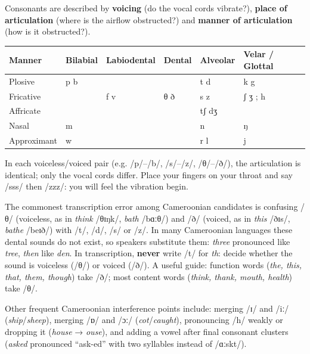 \documentclass[11pt]{article}
\newcounter{popsec}
\newcounter{popsub}
\newcommand{\courssub}[1]{%
  \stepcounter{popsub}%
  \par\vspace{9pt}\noindent{\popxbold\fontsize{11.5}{13}\selectfont\color{popink}{\color{poporange}\thepopsec.\thepopsub}\hspace{6pt}#1}\par\nopagebreak\vspace{4pt}
}
\begin{document}
\courssub{The Consonants}

Consonants are described by \textbf{voicing} (do the vocal cords vibrate?), \textbf{place of articulation} (where is the airflow obstructed?) and \textbf{manner of articulation} (how is it obstructed?).

\begin{center}
\begin{tabularx}{\linewidth}{|l|X|X|X|X|X|}
\hline
\rowcolor{popblueL} \textbf{Manner} & \textbf{Bilabial} & \textbf{Labiodental} & \textbf{Dental} & \textbf{Alveolar} & \textbf{Velar / Glottal} \\
\hline
Plosive & p b &  &  & t d & k g \\
\hline
Fricative &  & f v & θ ð & s z & ʃ ʒ ; h \\
\hline
Affricate &  &  &  & tʃ dʒ &  \\
\hline
Nasal & m &  &  & n & ŋ \\
\hline
Approximant & w &  &  & r l & j \\
\hline
\end{tabularx}
\end{center}

In each voiceless/voiced pair (e.g. /p/–/b/, /s/–/z/, /θ/–/ð/), the articulation is identical; only the vocal cords differ. Place your fingers on your throat and say /sss/ then /zzz/: you will feel the vibration begin.

\begin{attention}
The commonest transcription error among Cameroonian candidates is confusing /θ/ (voiceless, as in \emph{think} /θɪŋk/, \emph{bath} /bɑːθ/) and /ð/ (voiced, as in \emph{this} /ðɪs/, \emph{bathe} /beɪð/) with /t/, /d/, /s/ or /z/. In many Cameroonian languages these dental sounds do not exist, so speakers substitute them: \emph{three} pronounced like \emph{tree}, \emph{then} like \emph{den}. In transcription, \textbf{never} write /t/ for \emph{th}: decide whether the sound is voiceless (/θ/) or voiced (/ð/). A useful guide: function words (\emph{the, this, that, them, though}) take /ð/; most content words (\emph{think, thank, mouth, health}) take /θ/.
\end{attention}

Other frequent Cameroonian interference points include: merging /ɪ/ and /iː/ (\emph{ship}/\emph{sheep}), merging /ɒ/ and /ɔː/ (\emph{cot}/\emph{caught}), pronouncing /h/ weakly or dropping it (\emph{house} → \emph{ouse}), and adding a vowel after final consonant clusters (\emph{asked} pronounced ``ask-ed'' with two syllables instead of /ɑːskt/).
\end{document}
